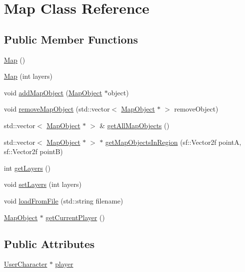 \hypertarget{class_map}{}\section{Map Class Reference}
\label{class_map}
\subsection*{Public Member Functions}
\begin{DoxyCompactItemize}
\item 
\hyperlink{class_map_a0f5ad0fd4563497b4214038cbca8b582}{Map} ()
\item 
\hyperlink{class_map_a9ff514eeb87534e6c4b3f993f3e9f406}{Map} (int layers)
\item 
void \hyperlink{class_map_a1b71cceb2a9e0b9f8986af2ecfb3bc16}{add\+Map\+Object} (\hyperlink{class_map_object}{Map\+Object} $\ast$object)
\item 
void \hyperlink{class_map_a130762c32398c6c2cdbbda936ff29fbe}{remove\+Map\+Object} (std\+::vector$<$ \hyperlink{class_map_object}{Map\+Object} $\ast$ $>$ remove\+Object)
\item 
std\+::vector$<$ \hyperlink{class_map_object}{Map\+Object} $\ast$ $>$ \& \hyperlink{class_map_aa10784ffe8226c88f658ffc755ff16f4}{get\+All\+Map\+Objects} ()
\item 
std\+::vector$<$ \hyperlink{class_map_object}{Map\+Object} $\ast$ $>$ $\ast$ \hyperlink{class_map_aa1099238d0a12b1626cc9d3811da2758}{get\+Map\+Objects\+In\+Region} (sf\+::\+Vector2f point\+A, sf\+::\+Vector2f point\+B)
\item 
int \hyperlink{class_map_aeb97cfc6eee55b83a85cf5cac587b6b0}{get\+Layers} ()
\item 
void \hyperlink{class_map_a1dc321d249a76abf38b6ddad21dd7a06}{set\+Layers} (int layers)
\item 
void \hyperlink{class_map_a3ea1555ffb08652c7c14844dc819d749}{load\+From\+File} (std\+::string filename)
\item 
\hyperlink{class_map_object}{Map\+Object} $\ast$ \hyperlink{class_map_abbffcadef89a43b12ae55d74d5546875}{get\+Current\+Player} ()
\end{DoxyCompactItemize}
\subsection*{Public Attributes}
\begin{DoxyCompactItemize}
\item 
\hyperlink{class_user_character}{User\+Character} $\ast$ \hyperlink{class_map_a95c3519f88d1414392aec57a2294ea41}{player}
\end{DoxyCompactItemize}


